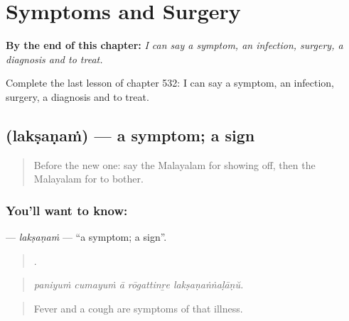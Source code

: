 
\chapter{Symptoms and Surgery}
\label{ch:ml-symptoms-and-surgery}

\begin{chapteropening}
\textbf{By the end of this chapter:} \emph{I can say a symptom, an infection, surgery, a diagnosis and to treat.}

Complete the last lesson of chapter 532: I can say a symptom, an infection, surgery, a diagnosis and to treat.
\end{chapteropening}

\section[\texorpdfstring{\ml{ലക്ഷണം} (lakṣaṇaṁ)}{ലക്ഷണം (lakṣaṇaṁ)}]{ (lakṣaṇaṁ) — a symptom; a sign}

\label{lesson:ML-C532-laksanam}



\begin{quote}
Before the new one: say the Malayalam for showing off, then the Malayalam for to bother.
\end{quote}

\subsection*{You'll want to know: }
\textbf{} — \emph{lakṣaṇaṁ} — \textquotedblleft{}a symptom; a sign\textquotedblright{}.

\begin{quote}
    .
\end{quote}

\begin{quote}
\emph{paniyuṁ cumayuṁ ā rōgattinṟe lakṣaṇaṅṅaḷāṇŭ.}
\end{quote}

\begin{quote}
Fever and a cough are symptoms of that illness.
\end{quote}

